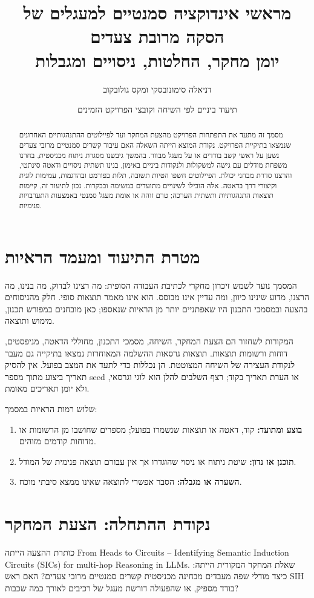 \documentclass[11pt,a4paper]{article}
\title{מראשי אינדוקציה סמנטיים למעגלים של הסקה מרובת צעדים\\\large יומן מחקר, החלטות, ניסויים ומגבלות}
\author{דניאלה סימונובסקי ומקס גולובקוב}
\date{תיעוד ביניים לפי השיחה וקובצי הפרויקט הזמינים}
\newcommand{\en}[1]{\textenglish{#1}}
\begin{document}
\maketitle
\begin{abstract}
מסמך זה מתעד את התפתחות הפרויקט מהצעת המחקר ועד לפיילוטים ההתנהגותיים האחרונים שנמצאו בתיקיית הפרויקט. נקודת המוצא הייתה השאלה האם עיבוד קשרים סמנטיים מרובי צעדים נשען על ראשי קשב בודדים או על מעגל מבוזר. בהמשך גיבשנו מסגרת ניתוח מכניסטית, בחרנו משפחת מודלים עם גישה למשקולות ולנקודות ביניים באימון, בנינו תשתית ניסויים ודאטה סינתטי, והרצנו סדרת מבחני יכולת. הפיילוטים חשפו הטיות תשובה, תלות בפורמט ובהדגמות, עמימות לוגית וקיצורי דרך בדאטה. אלה הובילו לשינויים מתועדים במשימה ובבקרות. נכון לתיעוד זה, קיימות תוצאות התנהגותיות ותשתית הערכה; טרם זוהה או אומת מעגל סמנטי באמצעות התערבויות פנימיות.
\end{abstract}
\tableofcontents
\newpage

\section{מטרת התיעוד ומעמד הראיות}
המסמך נועד לשמש זיכרון מחקרי לכתיבת העבודה הסופית: מה רצינו לבדוק, מה בנינו, מה הרצנו, מדוע שינינו כיוון, ומה עדיין אינו מבוסס. הוא אינו מאמר תוצאות סופי. חלק מהניסוחים בהצעה ובמסמכי התכנון היו שאפתניים יותר מן הראיות שנאספו; כאן מובחנים במפורש תכנון, מימוש ותוצאה.

המקורות לשחזור הם הצעת המחקר, השיחה, מסמכי התכנון, מחוללי הדאטה, מניפסטים, דוחות ורשומות תוצאות. תוצאות גרסאות ההשלמה המאוחרות נמצאו בתיקייה גם מעבר לנקודת העצירה של השיחה המצוטטת. הן נכללות כדי לתעד את המצב בפועל. אין להסיק תאריך ביצוע מתוך מספר \en{seed} או הערת תאריך בקוד; רצף השלבים להלן הוא לוגי וגרסאי, ולא יומן תאריכים מאומת.

שלוש רמות הראיות במסמך:
\begin{enumerate}
\item \textbf{בוצע ומתועד:} קוד, דאטה או תוצאות שנשמרו בפועל; מספרים שחושבו מן הרשומות או מדוחות קודמים מזוהים.
\item \textbf{תוכנן או נדון:} שיטת ניתוח או ניסוי שהוגדרו אך אין עבורם תוצאה פנימית של המודל.
\item \textbf{השערה או מגבלה:} הסבר אפשרי לתוצאה שאינו ממצא סיבתי מוכח.
\end{enumerate}

\section{נקודת ההתחלה: הצעת המחקר}
כותרת ההצעה הייתה \en{From Heads to Circuits -- Identifying Semantic Induction Circuits (SICs) for multi-hop Reasoning in LLMs}. שאלת המחקר המקורית הייתה: כיצד מודלי שפה מעבדים מבחינה מכניסטית קשרים סמנטיים מרובי צעדים? האם ראש \en{SIH} בודד מספיק, או שהפעולה דורשת מעגל של רכיבים לאורך כמה שכבות?
\end{document}

